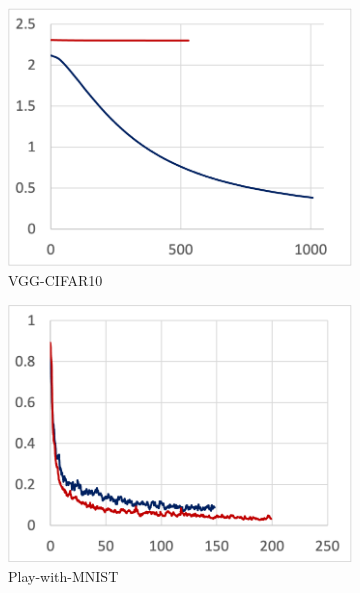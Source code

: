 \begin{figure}[!ht]
\begin{subfigure}[t]{.24\textwidth}
    \includegraphics[width=\textwidth]{keras-cifar}
    \caption{VGG-CIFAR10}
  \end{subfigure}
  \par\bigskip
  \begin{subfigure}[t]{.24\textwidth}
    \includegraphics[width=\textwidth]{tf2-03}
    \caption{Play-with-MNIST}
  \end{subfigure}
  ~
  \begin{subfigure}[t]{.24\textwidth}

\end{subfigure}
\end{figure}
